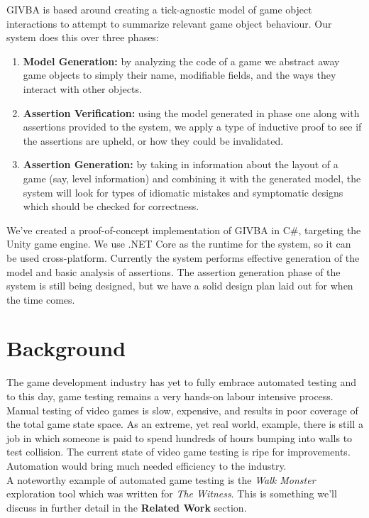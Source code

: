\documentclass[letterpaper,twocolumn,10pt]{article}
\begin{document}
GIVBA is based around creating a tick-agnostic model of game object interactions to attempt to summarize relevant game object behaviour. Our system does this over three phases:

\begin{enumerate}
    \item{\textbf{Model Generation:}} by analyzing the code of a game we abstract away game objects to simply their name, modifiable fields, and the ways they interact with other objects. 
    \item {\textbf{Assertion Verification:}} using the model generated in phase one along with assertions provided to the system, we apply a type of inductive proof to see if the assertions are upheld, or how they could be invalidated.
    \item{\textbf{Assertion Generation:}} by taking in information about the layout of a game (say, level information) and combining it with the generated model, the system will look for types of idiomatic mistakes and symptomatic designs which should be checked for correctness.
\end{enumerate}

We've created a proof-of-concept implementation of GIVBA in C\#, targeting the Unity game engine. We use .NET Core as the runtime for the system, so it can be used cross-platform. Currently the system performs effective generation of the model and basic analysis of assertions. The assertion generation phase of the system is still being designed, but we have a solid design plan laid out for when the time comes. \\

\section{Background}

The game development industry has yet to fully embrace automated testing and to this day, game testing remains a very hands-on labour intensive process. Manual testing of video games is slow, expensive, and results in poor coverage of the total game state space. As an extreme, yet real world, example, there is still a job in which someone is paid to spend hundreds of hours bumping into walls to test collision. The current state of video game testing is ripe for improvements. Automation would bring much needed efficiency to the industry. \\

A noteworthy example of automated game testing is the \textit{Walk Monster}~\cite{WalkMonster} exploration tool which was written for \textit{The Witness}. This is something we'll discuss in further detail in the \textbf{Related Work} section.
\end{document}
